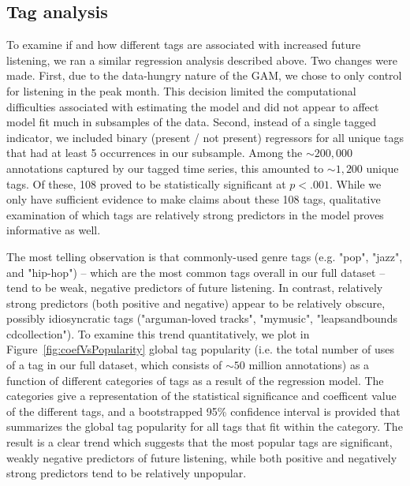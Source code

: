 \subsection{Tag analysis}
To examine if and how different tags are associated with increased future listening, we ran a similar regression analysis described above.  Two changes were made. First, due to the data-hungry nature of the GAM, we chose to only control for listening in the peak month. This decision limited the computational difficulties associated with estimating the model and did not appear to affect model fit much in subsamples of the data.  Second, instead of a single tagged indicator, we included binary (present / not present) regressors for all unique tags that had at least 5 occurrences in our subsample. Among the $\sim200,000$ annotations captured by our tagged time series, this amounted to $\sim1,200$ unique tags. Of these, 108 proved to be statistically significant at $p <.001$. While we only have sufficient evidence to make claims about these 108 tags, qualitative examination of which tags are relatively strong predictors in the model proves informative as well.

The most telling observation is that commonly-used genre tags (e.g. "pop", "jazz", and "hip-hop") -- which are the most common tags overall in our full dataset -- tend to be weak, negative predictors of future listening. In contrast, relatively strong predictors (both positive and negative) appear to be relatively obscure, possibly idiosyncratic tags ("arguman-loved tracks", "mymusic", "leapsandbounds cdcollection").  To examine this trend quantitatively, we plot in Figure~\ref{fig:coefVsPopularity} global tag popularity (i.e. the total number of uses of a tag in our full dataset, which consists of $\sim 50$ million annotations) as a function of different categories of tags as a result of the regression model.  The categories give a representation of the statistical significance and coefficent value of the different tags, and a bootstrapped 95\% confidence interval is provided that summarizes the global tag popularity for all tags that fit within the category. The result is a clear trend which suggests that the most popular tags are significant, weakly negative predictors of future listening, while both positive and negatively strong predictors tend to be relatively unpopular.

